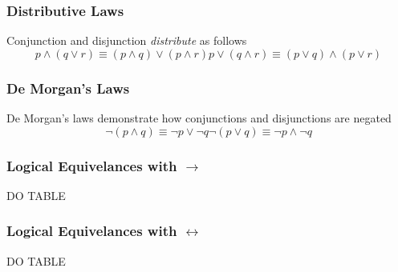 \documentclass[twocolumn]{report}
\begin{document}
\subsubsection{Distributive Laws}
Conjunction and disjunction \textit{distribute} as follows
\begin{subequations}
	\begin{equation}
		p\wedge(q\lor r)\equiv(p\wedge q)\lor(p\wedge r)
		\label{eqn: conjunction-distributivity}
	\end{equation}
	\begin{equation}
		p\lor(q\wedge r)\equiv(p\lor q)\wedge(p\lor r)
		\label{eqn: disjunction-distributivity}
	\end{equation}
\end{subequations}
\subsubsection{De Morgan's Laws}
De Morgan's laws demonstrate how conjunctions and disjunctions are negated
\begin{subequations}
	\begin{equation}
		\neg (p\wedge q) \equiv \neg p \lor \neg q
		\label{eqn: negation-of-conjunction}
	\end{equation}
	\begin{equation}
		\neg (p\lor q) \equiv \neg p \wedge \neg q
		\label{eqn: negation-of-disjunction}
	\end{equation}
\end{subequations}
\subsubsection{Logical Equivelances with $\rightarrow$}
DO TABLE
\subsubsection{Logical Equivelances with $\leftrightarrow$}
DO TABLE
\end{document}
